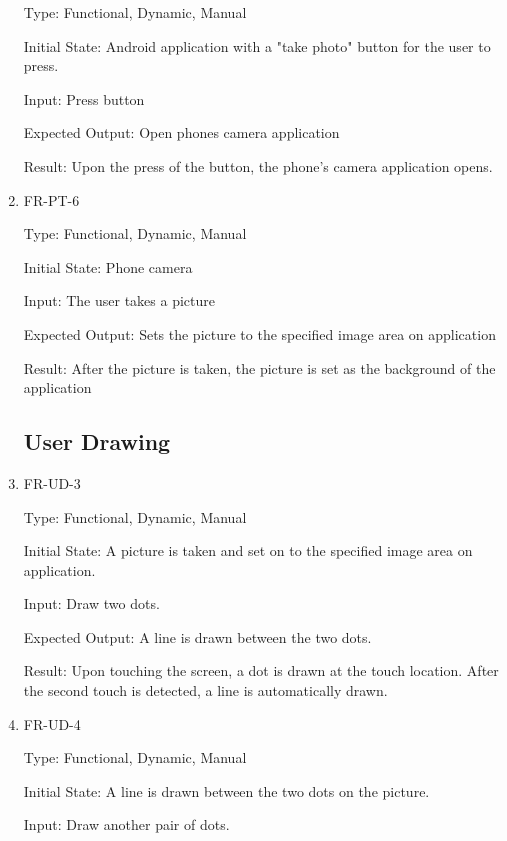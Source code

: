 \documentclass[12pt, titlepage]{article}
\begin{document}
\begin{enumerate}
	                Type: Functional, Dynamic, Manual
	
					Initial State: Android application with a "take photo" button for the user to press.
					
					Input: Press button
					
					Expected Output: Open phones camera application
					
					Result: Upon the press of the button, the phone's camera application opens.
	
						
					\item{FR-PT-6\\}
					
					Type: Functional, Dynamic, Manual
					
					Initial State: Phone camera 
					
					Input: The user takes a picture
					
					Expected Output: Sets the picture to the specified image area on application
					
					Result: After the picture is taken, the picture is set as the background of the application
					
				
					

	
\subsection{User Drawing}	
					\item{FR-UD-3\\}
					
					Type: Functional, Dynamic, Manual
					
					Initial State: A picture is taken and set on to the specified image area on application.
					
					Input: Draw two dots. 
					
					Expected Output: A line is drawn between the two dots.
					
					Result: Upon touching the screen, a dot is drawn at the touch location. After the second touch is detected, a line is automatically drawn.
					
					
					\item{FR-UD-4\\}
					
					Type: Functional, Dynamic, Manual
					
					Initial State: A line is drawn between the two dots on the picture.
					
					Input: Draw another pair of dots. 
					

\end{enumerate}
\end{document}
